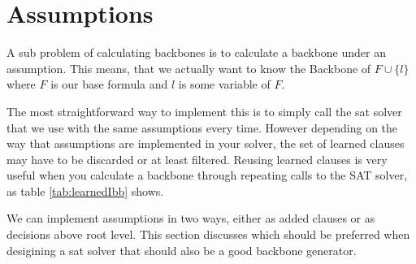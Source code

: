 \section{Assumptions}

A sub problem of calculating backbones is to calculate a backbone under an assumption. This means, that we actually want to know the Backbone of $F \cup\{l\}$ where $F$ is our base formula and $l$ is some variable of $F$.

The most straightforward way to implement this is to simply call the sat solver that we use with the same assumptions every time. However depending on the way that assumptions are implemented in your solver, the set of learned clauses may have to be discarded or at least filtered. Reusing learned clauses is very useful when you calculate a backbone through repeating calls to the SAT solver, as table \ref{tab:learnedIbb} shows.

We can implement assumptions in two ways, either as added clauses or as decisions above root level. This section discusses which should be preferred when desigining a sat solver that should also be a good backbone generator. 